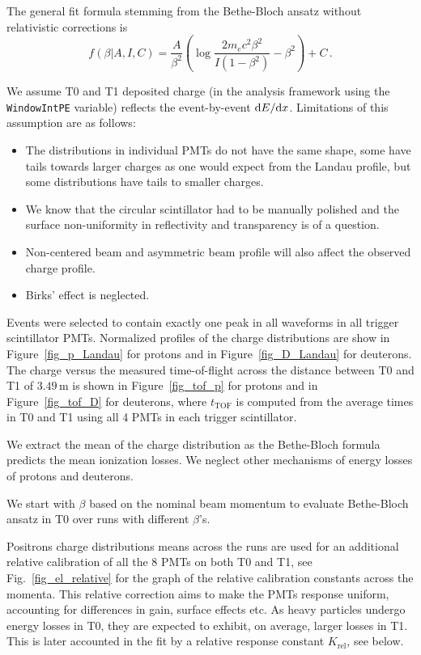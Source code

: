 \documentclass{article}[a4paper,12pt]
\begin{document}
The general fit formula stemming from the Bethe-Bloch ansatz without relativistic corrections is
$$ f(\beta|A,I,C) = \frac{A}{\beta^2} \left( \log \frac{2 m_e c^2 \beta^2}{I(1-\beta^2)} - \beta^2 \right) + C \,.$$

We assume T0 and T1 deposited charge (in the analysis framework using the \texttt{WindowIntPE} variable) reflects the event-by-event $\mathrm{d}E/\mathrm{d}x$.
Limitations of this assumption are as follows:
\begin{itemize}
  \item The distributions in individual PMTs do not have the same shape, some have tails towards larger charges as one would expect from the Landau profile, but some distributions have tails to smaller charges.
  \item We know that the circular scintillator had to be manually polished and the surface non-uniformity in reflectivity and transparency is of a question.
  \item Non-centered beam and asymmetric beam profile will also affect the observed charge profile.
    \item Birks' effect is neglected.
\end{itemize}

Events were selected to contain exactly one peak in all waveforms in all trigger scintillator PMTs.
Normalized profiles of the charge distributions are show in Figure~\ref{fig_p_Landau} for protons and in Figure~\ref{fig_D_Landau} for deuterons.
The charge versus the measured time-of-flight across the distance between T0 and T1 of $3.49\,$m is shown in Figure~\ref{fig_tof_p} for protons and in Figure~\ref{fig_tof_D} for deuterons, where $t_\mathrm{TOF}$ is computed from the average times in T0 and T1 using all 4 PMTs in each trigger scintillator.

We extract the mean of the charge distribution as the Bethe-Bloch formula predicts the mean ionization losses. We neglect other mechanisms of energy losses of protons and deuterons.

We start with $\beta$ based on the nominal beam momentum to evaluate Bethe-Bloch ansatz in T0 over runs with different $\beta$’s.

Positrons charge distributions means across the runs are used for an additional relative calibration of all the 8 PMTs on both T0 and T1, see Fig.~\ref{fig_el_relative} for the graph of the relative calibration constants across the momenta.
This relative correction aims to make the PMTs response uniform, accounting for differences in gain, surface effects etc.
As heavy particles undergo energy losses in T0, they are expected to exhibit, on average, larger losses in T1. This is later accounted in the fit by a relative response constant $K_\mathrm{rel}$, see below.
\end{document}
